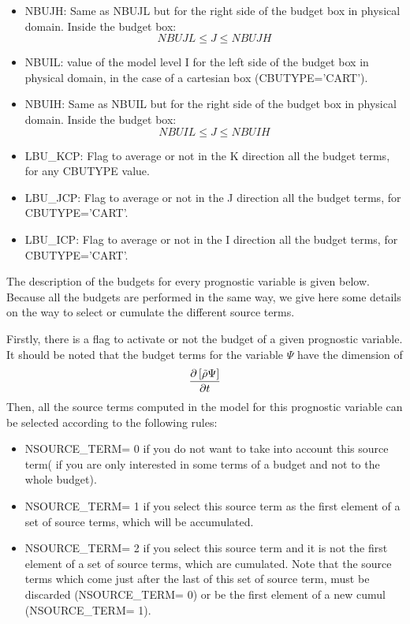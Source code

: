 \begin{itemize}
\item
{}
NBUJH: Same as NBUJL but for the right side of the budget box in physical domain.
 Inside the budget box:
$$ NBUJL \leq J \leq NBUJH $$

\item
{}
NBUIL: value of the model level I for the left side of the budget box in physical domain, in the case
of a cartesian box (CBUTYPE='CART').

\item
{}
NBUIH: Same as NBUIL but for the right side of the budget box in physical domain. Inside the budget box:
$$ NBUIL \leq J \leq NBUIH $$

\item
{}
LBU\_KCP: Flag to average or not in the K direction all the budget
terms, for any CBUTYPE value.

\item
{}
LBU\_JCP: Flag to average or not in the J direction all the budget
terms, for CBUTYPE='CART'.


\item
{}
LBU\_ICP: Flag to average or not in the I direction all the budget
terms, for CBUTYPE='CART'.

\end{itemize}

The description of the budgets for every prognostic variable is given below. Because all the budgets are performed in the same way, 
 we give here some details on the way to select or cumulate the different 
source terms.

Firstly, there is a flag to activate or not the budget of a given prognostic
variable. It should be noted that the budget terms for the variable $\Psi$ 
have the dimension of  
$$ {\partial \left[ \tilde{ \rho} \Psi \right] \over \partial t }$$   
Then, all the source terms computed in the model for this prognostic variable
can be selected according to the following rules:
\begin{itemize}
\item
NSOURCE\_TERM= 0 if you do not want to take into account  this source term( if you are only interested in some terms of a budget and not to the
whole budget).
\item
NSOURCE\_TERM= 1 if you select this source term as the first element of a
set of source terms, which will be  accumulated.
\item
NSOURCE\_TERM= 2 if you select this source term and it is not the first element of a
set of source terms, which are cumulated. Note that the source terms which come
just after the last of this set of source term, must be discarded (NSOURCE\_TERM= 0)
or be the first element of a new cumul (NSOURCE\_TERM= 1).
\end{itemize}

